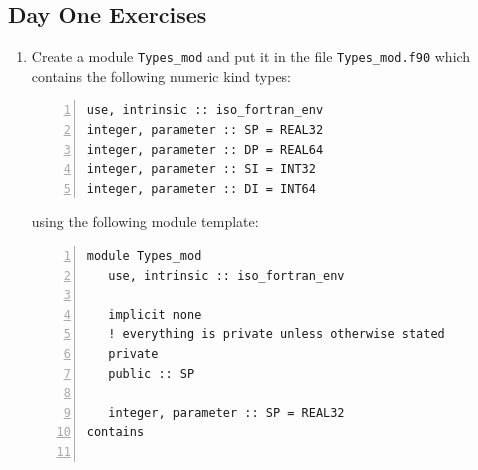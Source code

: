 \documentclass[12pt]{article}
\begin{document}
\subsection*{Day One Exercises}
\setdefaultleftmargin{0pt}{}{}{}{}{}
\begin{enumerate}
\item Create a module \texttt{Types\_mod} and put it in the file \texttt{Types\_mod.f90} which 
contains the following numeric kind types:
\begin{lstlisting}[numbers=left,numberstyle=\footnotesize\color{gray},caption={Kind parameters},captionpos=b,showstringspaces=false,label={kind:params},columns=fullflexible,basicstyle=\ttfamily,keywordstyle=\color{blue}\ttfamily,stringstyle=\color{red}\ttfamily,commentstyle=\color{green}\ttfamily,language={[08]Fortran},escapechar=|]
use, intrinsic :: iso_fortran_env
integer, parameter :: SP = REAL32
integer, parameter :: DP = REAL64
integer, parameter :: SI = INT32
integer, parameter :: DI = INT64
\end{lstlisting}
using the following module template: 
\begin{lstlisting}[numbers=left,numberstyle=\footnotesize\color{gray},caption={Module template},captionpos=b,showstringspaces=false,label={mod:template},columns=fullflexible,basicstyle=\ttfamily,keywordstyle=\color{blue}\ttfamily,stringstyle=\color{red}\ttfamily,commentstyle=\color{green}\ttfamily,language={[08]Fortran},escapechar=|]
module Types_mod
   use, intrinsic :: iso_fortran_env

   implicit none
   ! everything is private unless otherwise stated
   private 
   public :: SP

   integer, parameter :: SP = REAL32
contains


\end{lstlisting}
\end{enumerate}
\end{document}
